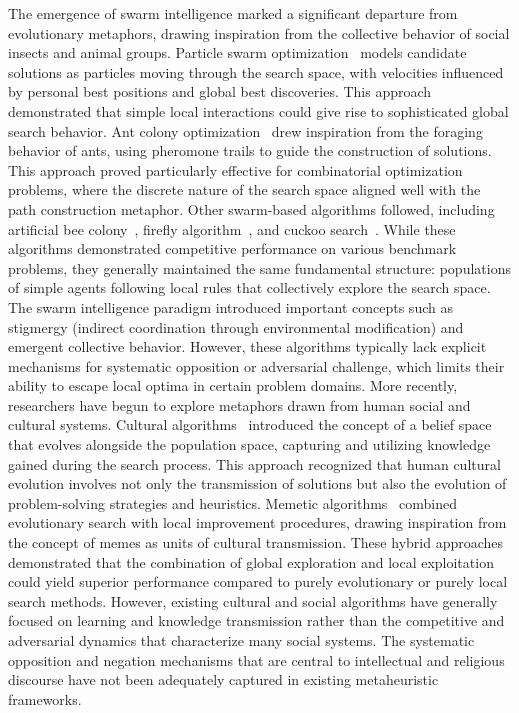\documentclass[11pt]{article}
\begin{document}
The emergence of swarm intelligence marked a significant departure from evolutionary metaphors, drawing inspiration from the collective behavior of social insects and animal groups. Particle swarm optimization~\citep{kennedy1995particle} models candidate solutions as particles moving through the search space, with velocities influenced by personal best positions and global best discoveries. This approach demonstrated that simple local interactions could give rise to sophisticated global search behavior.
Ant colony optimization~\citep{dorigo1996ant} drew inspiration from the foraging behavior of ants, using pheromone trails to guide the construction of solutions. This approach proved particularly effective for combinatorial optimization problems, where the discrete nature of the search space aligned well with the path construction metaphor.
Other swarm-based algorithms followed, including artificial bee colony~\citep{karaboga2005idea}, firefly algorithm~\citep{yang2008firefly}, and cuckoo search~\citep{yang2009cuckoo}. While these algorithms demonstrated competitive performance on various benchmark problems, they generally maintained the same fundamental structure: populations of simple agents following local rules that collectively explore the search space.
The swarm intelligence paradigm introduced important concepts such as stigmergy (indirect coordination through environmental modification) and emergent collective behavior. However, these algorithms typically lack explicit mechanisms for systematic opposition or adversarial challenge, which limits their ability to escape local optima in certain problem domains.
More recently, researchers have begun to explore metaphors drawn from human social and cultural systems. Cultural algorithms~\citep{reynolds1994introduction} introduced the concept of a belief space that evolves alongside the population space, capturing and utilizing knowledge gained during the search process. This approach recognized that human cultural evolution involves not only the transmission of solutions but also the evolution of problem-solving strategies and heuristics.
Memetic algorithms~\citep{moscato1989evolution} combined evolutionary search with local improvement procedures, drawing inspiration from the concept of memes as units of cultural transmission. These hybrid approaches demonstrated that the combination of global exploration and local exploitation could yield superior performance compared to purely evolutionary or purely local search methods.
However, existing cultural and social algorithms have generally focused on learning and knowledge transmission rather than the competitive and adversarial dynamics that characterize many social systems. The systematic opposition and negation mechanisms that are central to intellectual and religious discourse have not been adequately captured in existing metaheuristic frameworks.
\end{document}
